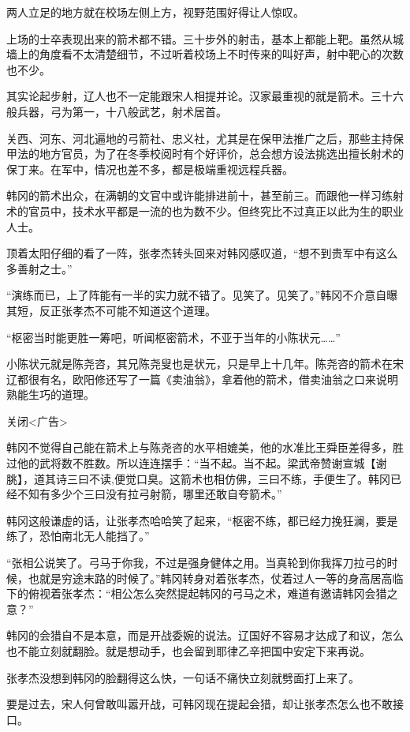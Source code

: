 两人立足的地方就在校场左侧上方，视野范围好得让人惊叹。

上场的士卒表现出来的箭术都不错。三十步外的射击，基本上都能上靶。虽然从城墙上的角度看不太清楚细节，不过听着校场上不时传来的叫好声，射中靶心的次数也不少。

其实论起步射，辽人也不一定能跟宋人相提并论。汉家最重视的就是箭术。三十六般兵器，弓为第一，十八般武艺，射术居首。

关西、河东、河北遍地的弓箭社、忠义社，尤其是在保甲法推广之后，那些主持保甲法的地方官员，为了在冬季校阅时有个好评价，总会想方设法挑选出擅长射术的保丁来。在军中，情况也差不多，都是极端重视远程兵器。

韩冈的箭术出众，在满朝的文官中或许能排进前十，甚至前三。而跟他一样习练射术的官员中，技术水平都是一流的也为数不少。但终究比不过真正以此为生的职业人士。

顶着太阳仔细的看了一阵，张孝杰转头回来对韩冈感叹道，“想不到贵军中有这么多善射之士。”

“演练而已，上了阵能有一半的实力就不错了。见笑了。见笑了。”韩冈不介意自曝其短，反正张孝杰不可能不知道这个道理。

“枢密当时能更胜一筹吧，听闻枢密箭术，不亚于当年的小陈状元……”

小陈状元就是陈尧咨，其兄陈尧叟也是状元，只是早上十几年。陈尧咨的箭术在宋辽都很有名，欧阳修还写了一篇《卖油翁》，拿着他的箭术，借卖油翁之口来说明熟能生巧的道理。

关闭<广告>

韩冈不觉得自己能在箭术上与陈尧咨的水平相媲美，他的水准比王舜臣差得多，胜过他的武将数不胜数。所以连连摆手：“当不起。当不起。梁武帝赞谢宣城【谢脁】，道其诗三曰不读,便觉口臭。这箭术也相仿佛，三曰不练，手便生了。韩冈已经不知有多少个三曰没有拉弓射箭，哪里还敢自夸箭术。”

韩冈这般谦虚的话，让张孝杰哈哈笑了起来，“枢密不练，都已经力挽狂澜，要是练了，恐怕南北无人能挡了。”

“张相公说笑了。弓马于你我，不过是强身健体之用。当真轮到你我挥刀拉弓的时候，也就是穷途末路的时候了。”韩冈转身对着张孝杰，仗着过人一等的身高居高临下的俯视着张孝杰：“相公怎么突然提起韩冈的弓马之术，难道有邀请韩冈会猎之意？”

韩冈的会猎自不是本意，而是开战委婉的说法。辽国好不容易才达成了和议，怎么也不能立刻就翻脸。就是想动手，也会留到耶律乙辛把国中安定下来再说。

张孝杰没想到韩冈的脸翻得这么快，一句话不痛快立刻就劈面打上来了。

要是过去，宋人何曾敢叫嚣开战，可韩冈现在提起会猎，却让张孝杰怎么也不敢接口。

